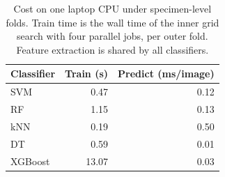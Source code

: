 \begin{table}[t]
\centering
\caption{Cost on one laptop CPU under specimen-level folds. Train time is the wall time of the inner grid search with four parallel jobs, per outer fold. Feature extraction is shared by all classifiers.}
\label{tab:timing}
\begin{tabular}{l r r}
\toprule
Classifier & Train (s) & Predict (ms/image) \\
\midrule
SVM & 0.47 & 0.12 \\
RF & 1.15 & 0.13 \\
kNN & 0.19 & 0.50 \\
DT & 0.59 & 0.01 \\
XGBoost & 13.07 & 0.03 \\
\bottomrule
\end{tabular}
\end{table}
